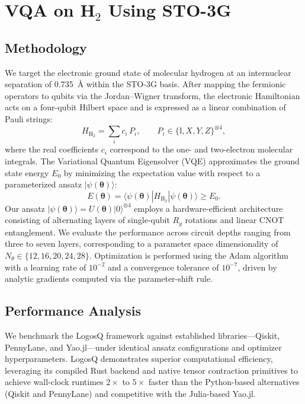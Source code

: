 \section{VQA on H$_2$ Using STO-3G}

\subsection{Methodology}
We target the electronic ground state of molecular hydrogen at an internuclear separation of 0.735~\r{A} within the STO-3G basis. After mapping the fermionic operators to qubits via the Jordan--Wigner transform, the electronic Hamiltonian acts on a four-qubit Hilbert space and is expressed as a linear combination of Pauli strings:
\begin{equation}
    H_{\text{H}_2} = \sum_{i} c_i\, P_i, \qquad P_i \in \{\mathbb{I}, X, Y, Z\}^{\otimes 4},
\end{equation}
where the real coefficients $c_i$ correspond to the one- and two-electron molecular integrals. The Variational Quantum Eigensolver (VQE) approximates the ground state energy $E_0$ by minimizing the expectation value with respect to a parameterized ansatz $|\psi(\boldsymbol{\theta})\rangle$:
\begin{equation}
    E(\boldsymbol{\theta}) = \langle \psi(\boldsymbol{\theta}) | H_{\text{H}_2} | \psi(\boldsymbol{\theta}) \rangle \ge E_0.
\end{equation}
Our ansatz $|\psi(\boldsymbol{\theta})\rangle = U(\boldsymbol{\theta})|0\rangle^{\otimes 4}$ employs a hardware-efficient architecture consisting of alternating layers of single-qubit $R_y$ rotations and linear CNOT entanglement. We evaluate the performance across circuit depths ranging from three to seven layers, corresponding to a parameter space dimensionality of $N_{\theta} \in \{12, 16, 20, 24, 28\}$. Optimization is performed using the Adam algorithm with a learning rate of $10^{-2}$ and a convergence tolerance of $10^{-7}$, driven by analytic gradients computed via the parameter-shift rule.

\subsection{Performance Analysis}
We benchmark the LogosQ framework against established libraries---Qiskit, PennyLane, and Yao.jl---under identical ansatz configurations and optimizer hyperparameters. LogosQ demonstrates superior computational efficiency, leveraging its compiled Rust backend and native tensor contraction primitives to achieve wall-clock runtimes $2\times$ to $5\times$ faster than the Python-based alternatives (Qiskit and PennyLane) and competitive with the Julia-based Yao.jl.


